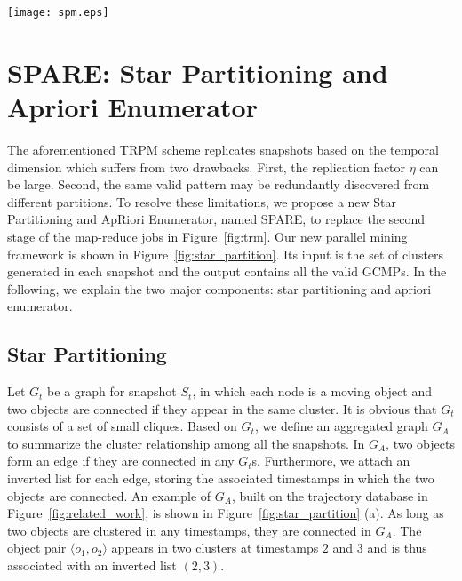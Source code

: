 \begin{figure*}[t]
\centering
\texttt{[image: spm.eps]}
\vspace{-0.5em}
\caption{Star Partitioning and ApRiori Enumerator (SPARE). (a) Aggregated graph $G_A$ generated from Figure 1. (b) Five star partitions are generated from $G_A$. Star IDs are circled, vertexes and inverted lists are in the connected tables.
(c) Apriori Enumerator with various pruning techniques.}
\label{fig:star_partition}
\vspace{-0.5em}
\end{figure*}

\section{SPARE: Star Partitioning and Apriori Enumerator}
\label{sec:spm}
The aforementioned TRPM scheme replicates snapshots based on the temporal dimension which suffers from two drawbacks. First, the replication factor $\eta$ can be large. Second, the same valid pattern may be redundantly discovered from different partitions.
To resolve these limitations,
we propose a new Star Partitioning and ApRiori Enumerator, named SPARE, 
to replace the second stage of the map-reduce jobs in Figure~\ref{fig:trm}. 
Our new parallel mining framework is shown in Figure~\ref{fig:star_partition}. 
Its input is the set of clusters generated in each snapshot and the output 
contains all the valid GCMPs. In the following, we explain the two major components: 
star partitioning and apriori enumerator.


\subsection{Star Partitioning}
Let $G_t$ be a graph for snapshot $S_t$, in which each node 
is a moving object and two objects are connected if they appear 
in the same cluster. It is obvious that $G_t$ consists of a set of small cliques. 
Based on $G_t$, we define an aggregated graph $G_A$ to summarize the 
cluster relationship among all the snapshots. In $G_A$, two objects
form an edge if they are connected in any $G_t$s. Furthermore, 
we attach an inverted list for each edge, 
storing the associated timestamps in which the two objects are connected. 
An example of $G_A$, built on the trajectory database in Figure~\ref{fig:related_work}, 
is shown in Figure~\ref{fig:star_partition} (a). 
As long as two objects are clustered in any timestamps, they are connected in $G_A$. 
The object pair $\langle o_1,o_2 \rangle$ appears in two clusters at timestamps 
$2$ and $3$ and is thus associated with an inverted list $(2,3)$.

